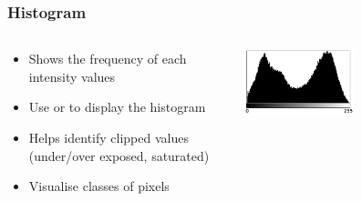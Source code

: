 \documentclass[ignorenonframetext,aspectratio=169,10pt,xcolor=table]{beamer}
\begin{document}
\begin{frame} \frametitle{Histogram}
  \begin{columns}
    \begin{column}{0.7\textwidth}
      \begin{itemize}
      \item Shows the frequency of each intensity values
      \item Use  or  to display the
        histogram
      \item Helps identify clipped values (under/over exposed, saturated)
      \item Visualise classes of pixels
      \end{itemize}
    \end{column}
    \begin{column}{0.7\textwidth}
      \includegraphics[width=0.5\textwidth]{histogram}
    \end{column}
  \end{columns}
\end{frame}
\end{document}
